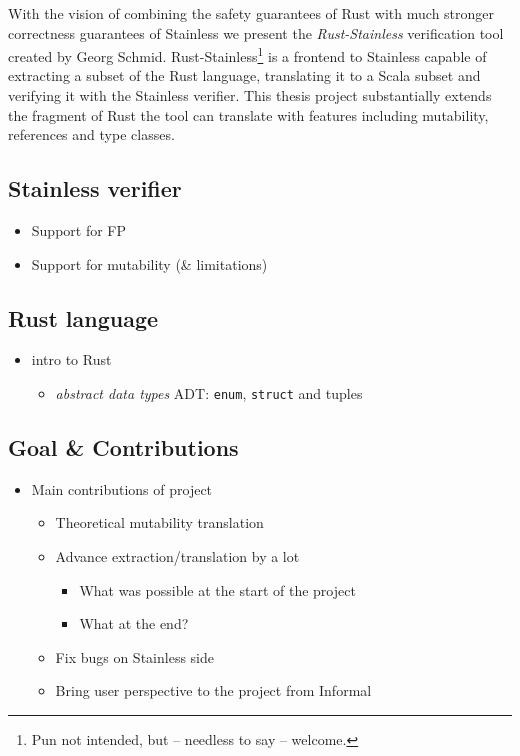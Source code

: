 With the vision of combining the safety guarantees of Rust with much
stronger correctness guarantees of Stainless we present the
\emph{Rust-Stainless} verification tool created by Georg Schmid.
Rust-Stainless\footnote{Pun not intended, but -- needless to say -- welcome.}
is a frontend to Stainless capable of extracting a subset of the Rust
language, translating it to a Scala subset and verifying it with the
Stainless verifier. This thesis project substantially extends the
fragment of Rust the tool can translate with features including
mutability, references and type classes.


\subsection{Stainless verifier}

\begin{itemize}
\tightlist
\item
  Support for FP
\item
  Support for mutability (\& limitations)
\end{itemize}

\subsection{Rust language}

\begin{itemize}
\tightlist
\item
  intro to Rust

  \begin{itemize}
  \tightlist
  \item
    \emph{abstract data types} ADT: \passthrough{\lstinline!enum!},
    \passthrough{\lstinline!struct!} and tuples
  \end{itemize}
\end{itemize}

\subsection{Goal \& Contributions}

\begin{itemize}
\tightlist
\item
  Main contributions of project

  \begin{itemize}
  \tightlist
  \item
    Theoretical mutability translation
  \item
    Advance extraction/translation by a lot

    \begin{itemize}
    \tightlist
    \item
      What was possible at the start of the project
    \item
      What at the end?
    \end{itemize}
  \item
    Fix bugs on Stainless side
  \item
    Bring user perspective to the project from Informal
  \end{itemize}
\end{itemize}
